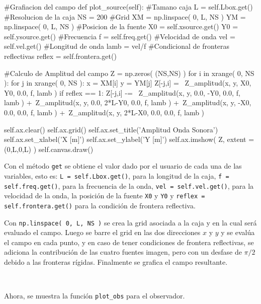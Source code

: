 \begin{listing}[style=python, numbers = none]
  #Grafiacion del campo
  def plot_source(self):
    #Tamano caja
    L = self.Lbox.get()
    #Resolucion de la caja
    NS = 200
    #Grid
    XM = np.linspace( 0, L, NS )
    YM = np.linspace( 0, L, NS )
    #Posicion de la fuente
    X0 = self.xsource.get()
    Y0 = self.ysource.get()
    #Frecuencia
    f = self.freq.get()
    #Velocidad de onda
    vel = self.vel.get()
    #Longitud de onda
    lamb = vel/f
    #Condicional de fronteras reflectivas
    reflex = self.frontera.get()
    
    #Calculo de Amplitud del campo
    Z = np.zeros( (NS,NS) )
    for i in xrange( 0, NS ):
      for j in xrange( 0, NS ):
	x = XM[i]
	y = YM[j]
	Z[-j,i] = \
	Z_amplitud(x, y, X0, Y0, 0.0, f, lamb )
	if reflex == 1:
	  Z[-j,i] -= \
	  Z_amplitud(x, y, 0.0, -Y0, 0.0, f, lamb ) +\
	  Z_amplitud(x, y, 0.0, 2*L-Y0, 0.0, f, lamb ) +\
	  Z_amplitud(x, y, -X0, 0.0, 0.0, f, lamb ) +\
	  Z_amplitud(x, y, 2*L-X0, 0.0, 0.0, f, lamb )

    self.ax.clear()
    self.ax.grid()
    self.ax.set_title('Amplitud Onda Sonora')
    self.ax.set_xlabel('X [m]')
    self.ax.set_ylabel('Y [m]')
    self.ax.imshow( Z, extent = (0,L,0,L) )
    self.canvas.draw()
\end{listing}


Con el método \texttt{get} se obtiene el valor dado por el usuario de cada
una de las variables, esto es: \texttt{L = self.Lbox.get()}, para la 
longitud de la caja, \texttt{f = self.freq.get()}, para la frecuencia de 
la onda, \texttt{vel = self.vel.get()}, para la velocidad de la onda, la 
posición de la fuente \texttt{X0} y \texttt{Y0} y 
\texttt{reflex = self.frontera.get()} para la condición de frontera 
reflectiva. 

Con \texttt{np.linspace( 0, L, NS )} se crea la grid asociada a la caja y 
en la cual será evaluado el campo. Luego se barre el grid en las dos 
direcciones $x$ y $y$ y se evalúa el campo en cada punto, y en caso de 
tener condiciones de frontera reflectivas, se adiciona la contribución de 
las cuatro fuentes imagen, pero con un desfase de $\pi/2$ debido a las 
fronteras rígidas. Finalmente se grafica el campo resultante.

\

Ahora, se muestra la función \texttt{plot\_obs} para el observador.


